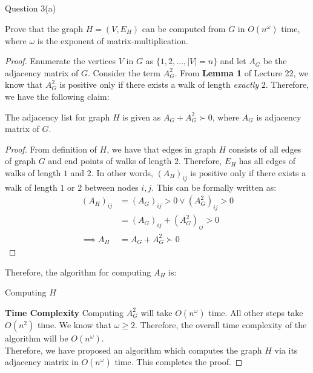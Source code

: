\begin{solution}{Question 3(a)}\label{ques:3a}
    \begin{question}
        Prove that the graph $H = (V, E_H)$ can be computed from $G$ in $O(n^\omega)$ time, where $\omega$ is the exponent of matrix-multiplication.
    \end{question}
    \tcblower{}
    \begin{proof}[Proof]
      Enumerate the vertices $V$ in $G$ as $\{1, 2, \ldots, |V| = n\}$ and let $A_G$ be the adjacency matrix of $G$. Consider the term $A_G^2$. From \textbf{Lemma 1} of Lecture 22, we know that $A_G^2$ is positive only if there exists a walk of length \textit{exactly} $2$. Therefore, we have the following claim:
      \begin{claim}
        The adjacency list for graph $H$ is given as $A_G+A_G^2 \succ 0$, where $A_G$ is adjacency matrix of $G$.
      \end{claim}
      \begin{proof}
        From definition of $H$, we have that edges in graph $H$ consists of all edges of graph $G$ and end points of walks of length $2$. Therefore, $E_H$ has all edges of walks of length $1$ and $2$. In other words, ${(A_H)}_{ij}$ is positive only if there exists a walk of length $1$ or $2$ between nodes $i, j$. This can be formally written as:
        \begin{equation}
          \begin{split}
            {(A_H)}_{ij} &= {(A_G)}_{ij} > 0 \vee {(A_G^2)}_{ij} > 0\\
                         &= {(A_G)}_{ij} + {(A_G^2)}_{ij} > 0\\
            \implies A_H &= A_G+A_G^2 \succ 0
          \end{split}
        \end{equation}
      \end{proof}
      Therefore, the algorithm for computing $A_H$ is:
      \begin{algorithm}[H]
        \caption{Computing $H$}
        \begin{algorithmic}[1]
              \Else{}
              \EndIf{}
            \EndFor{}
          \EndProcedure{}
        \end{algorithmic}
      \end{algorithm}
      \textbf{Time Complexity} Computing $A_G^2$ will take $O(n^\omega)$ time. All other steps take $O(n^2)$ time. We know that $\omega \geq 2$. Therefore, the overall time complexity of the algorithm will be $O(n^\omega)$.\\
      Therefore, we have proposed an algorithm which computes the graph $H$ via its adjacency matrix in $O(n^\omega)$ time. This completes the proof.
    \end{proof}
\end{solution}

